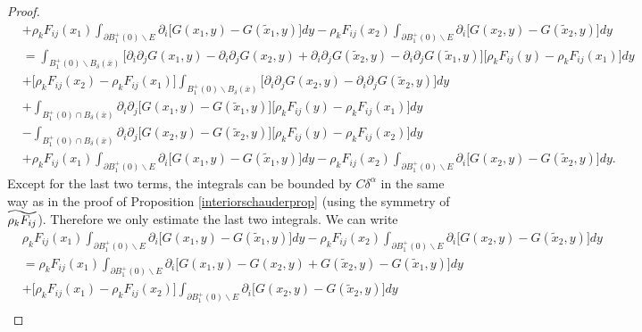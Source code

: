 \documentclass[12pt,a4paper]{article}
\theoremstyle{definition}
\theoremstyle{remark}
\numberwithin{equation}{section}
\newcommand\reallywidetilde[1]{\ThisStyle{%
  \setbox0=\hbox{$\SavedStyle#1$}%
  \stackengine{-.1\LMpt}{$\SavedStyle#1$}{%
    \stretchto{\scaleto{\SavedStyle\mkern.2mu\AC}{.5150\wd0}}{.6\ht0}%
  }{O}{c}{F}{T}{S}%
}}
\begin{document}
\begin{appendices}
\begin{proof}
\begin{align*}
&+ \rho_k  F_{ij} (x_1) \int_{\partial B_1^+ (0) \backslash E} \partial_i \bigg[ G(x_1,y) - G(\widetilde{x}_1,y) \bigg] dy - \rho_k  F_{ij} (x_2) \int_{\partial B_1^+ (0) \backslash E} \partial_i \bigg[ G(x_2,y) - G(\widetilde{x}_2,y) \bigg] dy \\
&= \int_{B_1^+ (0) \backslash B_\delta (\overline{x})} \big[\partial_i \partial_j G(x_1,y) - \partial_i \partial_j G(x_2,y) + \partial_i \partial_j G(\widetilde{x}_2,y) - \partial_i \partial_j G(\widetilde{x}_1,y) \big] \big[ \rho_k  F_{ij} (y)  - \rho_k  F_{ij} (x_1) \big] dy \\
&+ \big[ \rho_k  F_{ij} (x_2) - \rho_k  F_{ij} (x_1) \big] \int_{B_1^+ (0) \backslash B_\delta (\overline{x})} \big[ \partial_i \partial_j G(x_2,y) - \partial_i \partial_j G(\widetilde{x}_2,y) \big] dy \\
&+ \int_{B_1^+ (0) \cap B_\delta (\overline{x})} \partial_i \partial_j \bigg[ G(x_1,y) - G(\widetilde{x}_1,y) \bigg] \big [ \rho_k  F_{ij} (y) - \rho_k  F_{ij} (x_1) \big] dy \\
&- \int_{B_1^+ (0) \cap B_\delta (\overline{x})} \partial_i \partial_j \bigg[ G(x_2,y) - G(\widetilde{x}_2,y) \bigg] \big [ \rho_k  F_{ij} (y) - \rho_k  F_{ij} (x_2) \big] dy \\
&+ \rho_k  F_{ij} (x_1) \int_{\partial B_1^+ (0) \backslash E} \partial_i \bigg[ G(x_1,y) - G(\widetilde{x}_1,y) \bigg] dy - \rho_k  F_{ij} (x_2) \int_{\partial B_1^+ (0) \backslash E} \partial_i \bigg[ G(x_2,y) - G(\widetilde{x}_2,y) \bigg] dy.
\end{align*}
Except for the last two terms, the integrals can be bounded by $C \delta^\alpha$ in the same way as in the proof of Proposition \ref{interiorschauderprop} (using the symmetry of $\reallywidetilde{\rho_k F_{ij}}$). Therefore we only estimate the last two integrals. We can write 
\begin{align*}
&\rho_k  F_{ij} (x_1) \int_{\partial B_1^+ (0) \backslash E} \partial_i \bigg[ G(x_1,y) - G(\widetilde{x}_1,y) \bigg] dy - \rho_k  F_{ij} (x_2) \int_{\partial B_1^+ (0) \backslash E} \partial_i \bigg[ G(x_2,y) - G(\widetilde{x}_2,y) \bigg] dy \\
&= \rho_k  F_{ij} (x_1) \int_{\partial B_1^+ (0) \backslash E} \partial_i \bigg[ G(x_1,y) - G(x_2,y) + G(\widetilde{x}_2,y) - G(\widetilde{x}_1,y) \bigg] dy \\
&+ \big[\rho_k  F_{ij} (x_1) - \rho_k  F_{ij} (x_2) \big] \int_{\partial B_1^+ (0) \backslash E} \partial_i \bigg[ G(x_2,y) - G(\widetilde{x}_2,y) \bigg] dy \\

\end{align*}
\end{proof}
\end{appendices}
\end{document}
